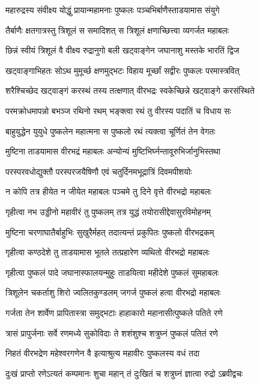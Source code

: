 \twolineshloka
{महारुद्रस्य संवीक्ष्य योद्धुं प्रायान्महामनाः}
{पुष्कलः पञ्चभिर्बाणैस्ताडयामास संयुगे}%

\twolineshloka
{तैर्बाणैः क्षतगात्रस्तु त्रिशूलं स समादिशत्}
{स त्रिशूलं क्षणाच्छित्त्वा व्यगर्जत महाबलः}%

\twolineshloka
{छिन्नं स्वीयं त्रिशूलं वै वीक्ष्य रुद्रानुगो बली}
{खट्वाङ्गेन जघानाशु मस्तके भारतिं द्विज}%

\twolineshloka
{खट्वाङ्गाभिहतः सोऽथ मुमूर्च्छ क्षणमुद्भटः}
{विहाय मूर्च्छां सद्वीरः पुष्कलः परमास्त्रवित्}%

\twolineshloka
{शरैश्चिच्छेद खट्वाङ्गं करस्थं तस्य तत्क्षणात्}
{वीरभद्रः स्वकेच्छिन्ने खट्वाङ्गे करसंस्थिते}%

\twolineshloka
{परमक्रोधमापन्नो बभञ्ज रथिनो रथम्}
{भङ्क्त्वा रथं तु वीरस्य पदातिं च विधाय सः}%

\twolineshloka
{बाहुयुद्धेन युयुधे पुष्कलेन महात्मना}
{स पुष्कलो रथं त्यक्त्वा चूर्णितं तेन वेगतः}%

\twolineshloka
{मुष्टिना ताडयामास वीरभद्रं महाबलः}
{अन्योन्यं मुष्टिभिर्घ्नन्तावूरुभिर्जानुभिस्तथा}%

\twolineshloka
{परस्परवधोद्युक्तौ परस्परजयैषिणौ}
{एवं चतुर्दिनमभूद्रात्रिं दिवमपीशयोः}%

\twolineshloka
{न कोपि तत्र हीयेत न जीयेत महाबलः}
{पञ्चमे तु दिने वृत्ते वीरभद्रो महाबलः}%

\twolineshloka
{गृहीत्वा नभ उड्डीनो महावीरं तु पुष्कलम्}
{तत्र युद्धं तयोरासीद्देवासुरविमोहनम्}%

\twolineshloka
{मुष्टिना चरणाघातैर्बाहुभिः सुखुरैर्महत्}
{तदात्यन्तं प्रकुपितः पुष्कलो वीरभद्रकम्}%

\twolineshloka
{गृहीत्वा कण्ठदेशे तु ताडयामास भूतले}
{तत्प्रहारेण व्यथितो वीरभद्रो महाबलः}%

\twolineshloka
{गृहीत्वा पुष्कलं पादे जघानास्फालयन्मुहुः}
{ताडयित्वा महीदेशे पुष्कलं सुमहाबलः}%

\twolineshloka
{त्रिशूलेन चकर्ताशु शिरो ज्वलितकुण्डलम्}
{जगर्ज पुष्कलं हत्वा वीरभद्रो महाबलः}%

\twolineshloka
{गर्जता तेन शार्वेण प्रापितास्त्रा समुद्भटाः}
{हाहाकारो महानासीत्पुष्कले पतिते रणे}%

\twolineshloka
{त्रासं प्रापुर्जनाः सर्वे रणमध्ये सुकोविदाः}
{ते शशंशुश्च शत्रुघ्नं पुष्कलं पतितं रणे}%

\twolineshloka
{निहतं वीरभद्रेण महेश्वरगणेन वै}
{इत्याश्रुत्य महावीरः पुष्कलस्य वधं तदा}%

\twolineshloka
{दुःखं प्राप्तो रणेऽत्यतं कम्पमानः शुचा महान्}
{तं दुःखितं च शत्रुघ्नं ज्ञात्वा रुद्रो ऽब्रवीद्वचः}%

